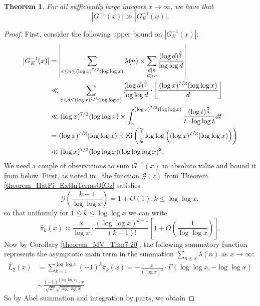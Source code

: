\documentclass[11pt,reqno,a4letter]{article}
\numberwithin{figure}{section}
\numberwithin{table}{section}
\newcommand{\floor}[1]{\left\lfloor #1 \right\rfloor}
\newcommand{\Floor}[2]{\ensuremath{\left\lfloor \frac{#1}{#2} \right\rfloor}}
\theoremstyle{plain}
\newtheorem{theorem}{Theorem}
\numberwithin{theorem}{section}
\theoremstyle{definition}
\begin{document}
\begin{theorem} 
\label{theorem_GInvxLowerBoundByGEInvx_v1} 
For all sufficiently large integers $x \rightarrow \infty$, we have that 
\[
|G^{-1}(x)| \gg |G_E^{-1}(x)|. 
\]
\end{theorem} 
\begin{proof} 
First, consider the following upper bound on $|G_E^{-1}(x)|$: 
\begin{align} 
\notag 
|G_E^{-1}(x)| & = \left\lvert \sum_{\substack{e \leq n \leq (\log x)^{7/3} (\log\log x)}} \lambda(n) \times 
     \sum_{\substack{d|n \\ d > e}} \frac{(\log d)^{\frac{3}{4}}}{\log\log d} 
     \right\rvert \\ 
\notag 
     & \ll \sum_{e < d \leq (\log x)^{7/3} (\log\log x)} \frac{(\log d)^{\frac{3}{4}}}{\log\log d} \cdot 
     \Floor{(\log x)^{7/3} (\log\log x)}{d} \\ 
\notag 
     & \ll (\log x)^{7/3} (\log\log x) \times 
     \int_{e}^{(\log x)^{7/3} (\log\log x)} \frac{(\log t)^{\frac{3}{4}}}{t \cdot \log\log t} dt \\ 
\notag 
     & = (\log x)^{7/3} (\log\log x) \times 
     \operatorname{Ei}\left(\frac{7}{4} \log\log\left((\log x)^{7/3} (\log\log x)\right)\right) \\ 
\label{eqn_proof_tag_AbsGEInvx_AsymptoticUpperBound_v1} 
     & \ll (\log x)^{7/3} (\log\log x) (\log\log\log x)^2. 
\end{align} 
We need a couple of observations to sum $G^{-1}(x)$ in absolute value and bound it from below. 
First, as noted in \cite[\S 7.4]{MV}, the function $\mathcal{G}(z)$ from 
Theorem \ref{theorem_HatPi_ExtInTermsOfGz} satisfies 
\[
\mathcal{G}\left(\frac{k-1}{\log\log x}\right) = 1 + O(1), k \leq \log\log x, 
\]
so that uniformly for $1 \leq k \leq \log\log x$ we can write 
\[
\widehat{\pi}_k(x) \asymp \frac{x}{\log x} \cdot \frac{(\log\log x)^{k-1}}{(k-1)!} \left[ 
     1 + O\left(\frac{1}{\log\log x}\right)\right]. 
\]
Now by Corollary \ref{theorem_MV_Thm7.20}, the 
following summatory function represents the asymptotic main term 
in the summation $\sum_{n \leq x} \lambda(n)$ as $x \rightarrow \infty$: 
\begin{align*} 
\widehat{L}_2(x) & = \sum_{k=1}^{\log\log x} (-1)^{k} \widehat{\pi}_k(x) 
     = - \frac{x}{(\log x)^2} \cdot \Gamma(\log\log x, -\log\log x) \\ 
     & \sim \frac{(-1)^{\floor{\log\log x}} \cdot x}{\sqrt{2\pi} \sqrt{\log\log x}}
\end{align*} 
So by Abel summation and integration by parts, we obtain 

\end{proof}
\end{document}

